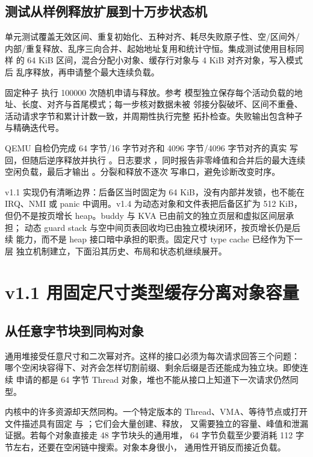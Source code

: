 \subsection{测试从样例释放扩展到十万步状态机}

单元测试覆盖无效区间、重复初始化、五种对齐、耗尽失败原子性、空/区间外/
内部/重复释放、乱序三向合并、起始地址复用和统计守恒。集成测试使用目标同样
的 64 KiB 区间，混合分配小对象、缓存行对象与 4 KiB 对齐对象，写入模式后
乱序释放，再申请整个最大连续负载。

固定种子  执行 100000 次随机申请与释放。参考
模型独立保存每个活动负载的地址、长度、对齐与首尾模式；每一步核对数据未被
邻接分裂破坏、区间不重叠、活动请求字节和累计计数一致，并周期性执行完整
拓扑检查。失败输出包含种子与精确迭代号。

QEMU 自检仍完成 64 字节/16 字节对齐和 4096 字节/4096 字节对齐的真实
写回，但随后逆序释放并执行 。日志要求
，同时报告非零峰值和合并后的最大连续
空闲负载，最后才输出 。分裂和释放不逐次
写串口，避免诊断改变时序。

v1.1 实现仍有清晰边界：后备区当时固定为 64 KiB，没有内部并发锁，也不能在
IRQ、NMI 或 panic 中调用。v1.4 为动态对象和文件表把后备区扩为 512 KiB，
但仍不是按页增长 heap。buddy 与 KVA 已由前文的独立页层和虚拟区间层承担；
动态 guard stack 与空中间页表回收均已由独立模块闭环，按页增长仍是后续
能力，而不是 heap 接口暗中承担的职责。固定尺寸 type cache 已经作为下一层
独立机制建立，下面沿其历史、布局和状态机继续展开。

\section{v1.1 用固定尺寸类型缓存分离对象容量}

\subsection{从任意字节块到同构对象}

通用堆接受任意尺寸和二次幂对齐。这样的接口必须为每次请求回答三个问题：
哪个空闲块容得下、对齐会怎样切割前缀、剩余后缀是否还能成为独立块。即使连续
申请的都是 64 字节 Thread 对象，堆也不能从接口上知道下一次请求仍然同型。

内核中的许多资源却天然同构。一个特定版本的 Thread、VMA、等待节点或打开
文件描述具有固定  与 ；它们会大量创建、释放，
又需要独立的容量、峰值和泄漏证据。若每个对象直接走 48 字节块头的通用堆，
64 字节负载至少要消耗 112 字节左右，还要在空闲链中搜索。对象本身很小，
通用性开销反而接近负载。

